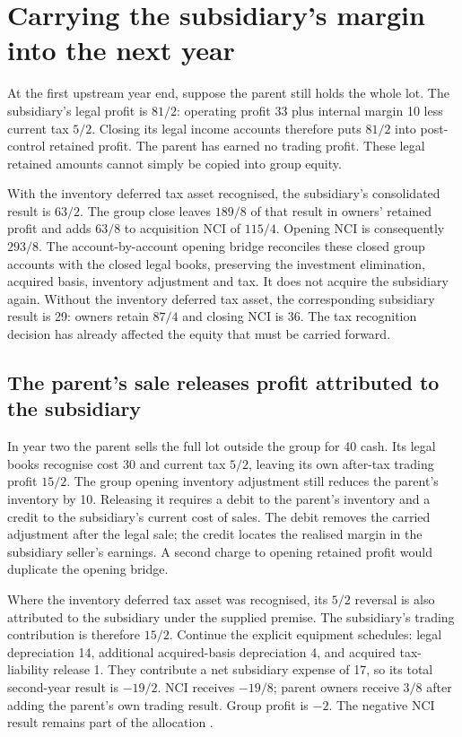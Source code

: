 \section{Carrying the subsidiary's margin into the next year}
\label{sec:worked-upstream-carry}

At the first upstream year end, suppose the parent still holds the whole lot.
The subsidiary's legal profit is $81/2$: operating profit 33 plus internal
margin 10 less current tax $5/2$. Closing its legal income accounts therefore
puts $81/2$ into post-control retained profit. The parent has earned no trading
profit. These legal retained amounts cannot simply be copied into group equity.

With the inventory deferred tax asset recognised, the subsidiary's
consolidated result is $63/2$. The group close leaves $189/8$ of that result
in owners' retained profit and adds $63/8$ to acquisition NCI of $115/4$.
Opening NCI is consequently $293/8$. The account-by-account opening bridge
reconciles these closed group accounts with the closed legal books, preserving
the investment elimination, acquired basis, inventory adjustment and tax.
It does not acquire the subsidiary again. Without the inventory deferred tax
asset, the corresponding subsidiary result is 29: owners retain $87/4$ and
closing NCI is 36. The tax recognition decision has already affected the
equity that must be carried forward.

\subsection{The parent's sale releases profit attributed to the subsidiary}

In year two the parent sells the full lot outside the group for 40 cash.
Its legal books recognise cost 30 and current tax $5/2$, leaving its own
after-tax trading profit $15/2$. The group opening inventory adjustment still
reduces the parent's inventory by 10. Releasing it requires a debit to the
parent's inventory and a credit to the subsidiary's current cost of sales.
The debit removes the carried adjustment after the legal sale; the credit
locates the realised margin in the subsidiary seller's earnings. A second
charge to opening retained profit would duplicate the opening bridge.

Where the inventory deferred tax asset was recognised, its $5/2$ reversal is
also attributed to the subsidiary under the supplied premise. The subsidiary's
trading contribution is therefore $15/2$. Continue the explicit equipment
schedules: legal depreciation 14, additional acquired-basis depreciation 4,
and acquired tax-liability release 1. They contribute a net subsidiary expense
of 17, so its total second-year result is $-19/2$. NCI receives $-19/8$;
parent owners receive $3/8$ after adding the parent's own trading result.
Group profit is $-2$. The negative NCI result remains part of the allocation
\citep[paras.~B88, B94]{aasb10control2026}.

